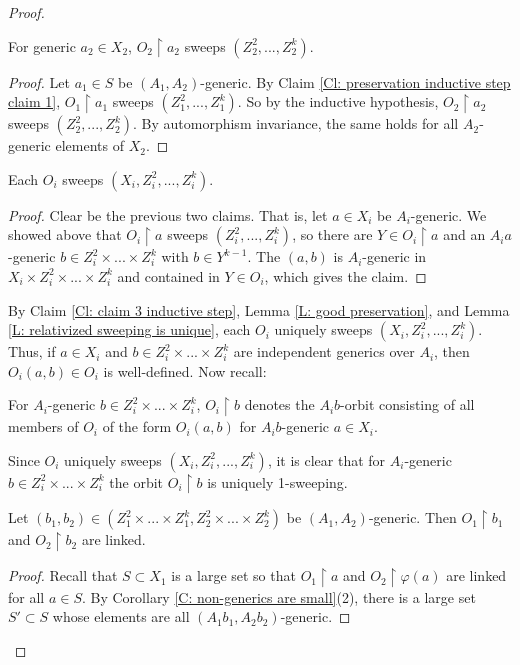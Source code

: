 \documentclass[10pt,a4paper]{amsart}
\begin{document}
\begin{proof}
    \begin{claim}\label{Cl: claim 2 inductive step}
        For generic $a_2\in X_2$, $O_2\restriction a_2$ sweeps $(Z_2^2,...,Z_2^k)$.
    \end{claim}
    \begin{proof}
        Let $a_1\in S$ be $(A_1,A_2)$-generic. By Claim \ref{Cl: preservation inductive step claim 1}, $O_1\restriction a_1$ sweeps $(Z_1^2,...,Z_1^k)$. So by the inductive hypothesis, $O_2\restriction a_2$ sweeps $(Z_2^2,...,Z_2^k)$. By automorphism invariance, the same holds for all $A_2$-generic elements of $X_2$.
    \end{proof}

    \begin{claim}\label{Cl: claim 3 inductive step}
    Each $O_i$ sweeps $(X_i,Z_i^2,...,Z_i^k)$.
    \end{claim}
    \begin{proof}
        Clear be the previous two claims. That is, let $a\in X_i$ be $A_i$-generic. We showed above that $O_i\restriction a$ sweeps $(Z_i^2,...,Z_i^k)$, so there are $Y\in O_i\restriction a$ and an $A_ia$-generic $b\in Z_i^2\times...\times Z_i^k$ with $b\in Y^{k-1}$. The $(a,b)$ is $A_i$-generic in $X_i\times Z_i^2\times...\times Z_i^k$ and contained in $Y\in O_i$, which gives the claim.
    \end{proof}

    By Claim \ref{Cl: claim 3 inductive step}, Lemma \ref{L: good preservation}, and Lemma \ref{L: relativized sweeping is unique}, each $O_i$ uniquely sweeps $(X_i,Z_i^2,...,Z_i^k)$. Thus, if $a\in X_i$ and $b\in Z_i^2\times...\times Z_i^k$ are independent generics over $A_i$, then $O_i(a,b)\in O_i$ is well-defined. Now recall:

    \begin{notation} For $A_i$-generic $b\in Z_i^2\times...\times Z_i^k$, $O_i\restriction b$ denotes the $A_ib$-orbit consisting of all members of $O_i$ of the form $O_i(a,b)$ for $A_ib$-generic $a\in X_i$.
    \end{notation}

    Since $O_i$ uniquely sweeps $(X_i,Z_i^2,...,Z_i^k)$, it is clear that for $A_i$-generic $b\in Z_i^2\times...\times Z_i^k$ the orbit $O_i\restriction b$ is uniquely 1-sweeping.

    \begin{claim}\label{Cl: claim 4 inductive step}
        Let $(b_1,b_2)\in(Z_1^2\times...\times Z_1^k,Z_2^2\times...\times Z_2^k)$ be $(A_1,A_2)$-generic. Then $O_1\restriction b_1$ and $O_2\restriction b_2$ are linked.
    \end{claim}
    \begin{proof}
        Recall that $S\subset X_1$ is a large set so that $O_1\restriction a$ and $O_2\restriction\varphi(a)$ are linked for all $a\in S$. By Corollary \ref{C: non-generics are small}(2), there is a large set $S'\subset S$ whose elements are all $(A_1b_1,A_2b_2)$-generic.


\end{proof}
\end{proof}
\end{document}
